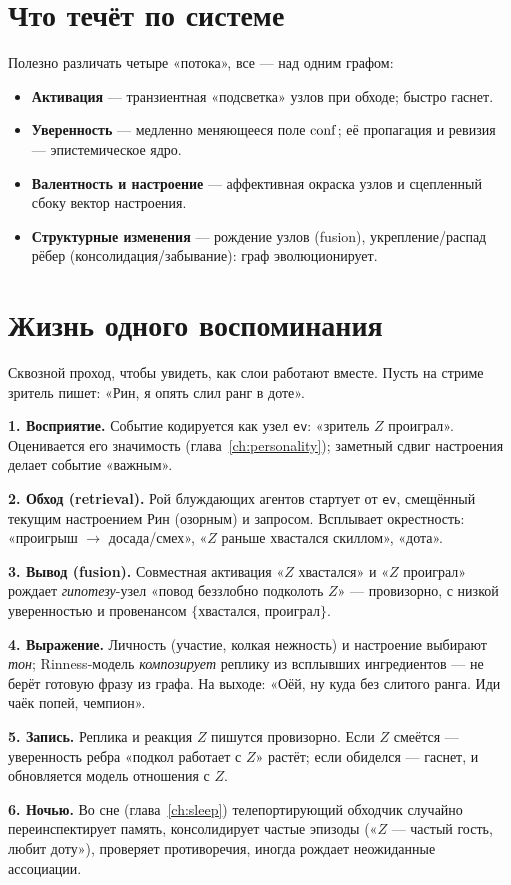\section{Что течёт по системе}

Полезно различать четыре «потока», все — над одним графом:

\begin{itemize}
\item \textbf{Активация} — транзиентная «подсветка» узлов при обходе; быстро гаснет.
\item \textbf{Уверенность} — медленно меняющееся поле $\mathrm{conf}$; её пропагация и
ревизия — эпистемическое ядро.
\item \textbf{Валентность и настроение} — аффективная окраска узлов и сцепленный
сбоку вектор настроения.
\item \textbf{Структурные изменения} — рождение узлов (fusion), укрепление/распад
рёбер (консолидация/забывание): граф эволюционирует.
\end{itemize}

\section{Жизнь одного воспоминания}

Сквозной проход, чтобы увидеть, как слои работают вместе. Пусть на стриме зритель
пишет: «Рин, я опять слил ранг в доте».

\begin{workedbox}
\textbf{1. Восприятие.} Событие кодируется как узел \texttt{ev}: «зритель $Z$
проиграл». Оценивается его значимость (глава~\ref{ch:personality}); заметный сдвиг
настроения делает событие «важным».

\textbf{2. Обход (retrieval).} Рой блуждающих агентов стартует от \texttt{ev},
смещённый текущим настроением Рин (озорным) и запросом. Всплывает окрестность:
«проигрыш $\to$ досада/смех», «$Z$ раньше хвастался скиллом», «дота».

\textbf{3. Вывод (fusion).} Совместная активация «$Z$ хвастался» и «$Z$ проиграл»
рождает \emph{гипотезу}-узел «повод беззлобно подколоть $Z$» — провизорно, с низкой
уверенностью и провенансом $\{$хвастался, проиграл$\}$.

\textbf{4. Выражение.} Личность (участие, колкая нежность) и настроение выбирают
\emph{тон}; Rinness-модель \emph{композирует} реплику из всплывших ингредиентов —
не берёт готовую фразу из графа. На выходе: «Оёй, ну куда без слитого ранга. Иди
чаёк попей, чемпион».

\textbf{5. Запись.} Реплика и реакция $Z$ пишутся провизорно. Если $Z$ смеётся —
уверенность ребра «подкол работает с $Z$» растёт; если обиделся — гаснет, и
обновляется модель отношения с $Z$.

\textbf{6. Ночью.} Во сне (глава~\ref{ch:sleep}) телепортирующий обходчик случайно
переинспектирует память, консолидирует частые эпизоды («$Z$ — частый гость, любит
доту»), проверяет противоречия, иногда рождает неожиданные ассоциации.
\end{workedbox}

